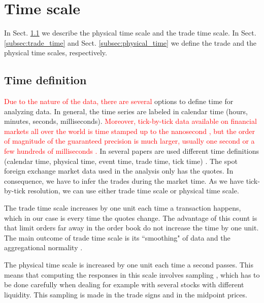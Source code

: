 \section{Time scale}\label{sec:time_scale}

In Sect. \ref{subsec:time_definition} we describe the physical time scale and
the trade time scale. In Sect. \ref{subsec:trade_time} and Sect.
\ref{subsec:physical_time} we define the trade and the physical time scales,
respectively.

\subsection{Time definition}\label{subsec:time_definition}

\textcolor{red}{Due to the nature of the data, there are several} options to define time for
analyzing data. In general, the time series are labeled in calendar time
(hours, minutes, seconds, milliseconds). \textcolor{red}{Moreover, tick-by-tick data available
on financial markets all over the world is time stamped up to the nanosecond \cite{xetra},
but the order of magnitude of the guaranteed precision is much larger, usually
one second or a few hundreds of milliseconds
\cite{market_digest,empirical_facts}.} In several papers are used different time
definitions (calendar time, physical time, event time, trade time, tick time)
\cite{empirical_facts,sampling_returns,market_making}. The spot foreign
exchange market data used in the analysis only has the quotes. In consequence,
we have to infer the trades during the market time. As we have tick-by-tick
resolution, we can use either trade time scale or physical time scale.

The trade time scale increases by one unit each time a transaction happens,
which in our case is every time the quotes change. The advantage of this count
is that limit orders far away in the order book do not increase the time by one
unit. The main outcome of trade time scale is its ``smoothing" of data and the
aggregational normality \cite{empirical_facts}.

The physical time scale is increased by one unit each time a second passes.
This means that computing the responses in this scale involves sampling
\cite{Wang_2016_cross,sampling_returns}, which has to be done carefully when
dealing for example with several stocks with different liquidity. This sampling
is made in the trade signs and in the midpoint prices.

